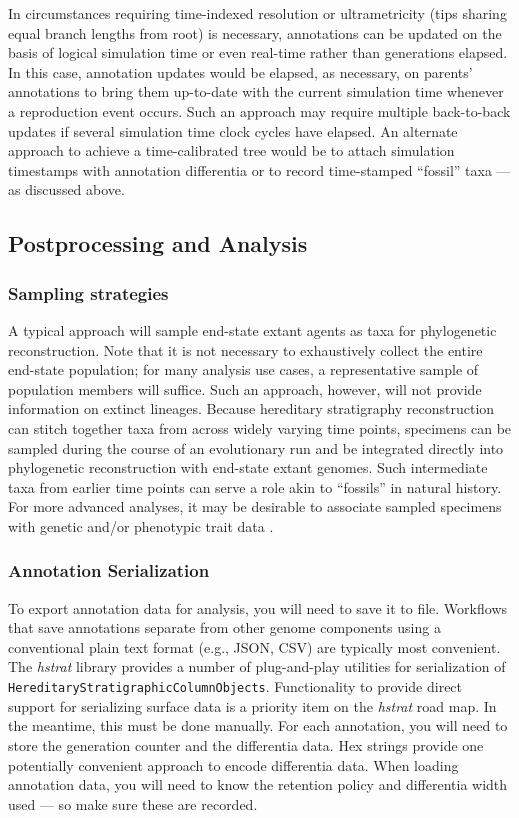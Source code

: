In circumstances requiring time-indexed resolution or ultrametricity (tips sharing equal branch lengths from root) is necessary, annotations can be updated on the basis of logical simulation time or even real-time rather than generations elapsed.
In this case, annotation updates would be elapsed, as necessary, on parents' annotations to bring them up-to-date with the current simulation time whenever a reproduction event occurs.
Such an approach may require multiple back-to-back updates if several simulation time clock cycles have elapsed.
An alternate approach to achieve a time-calibrated tree would be to attach simulation timestamps with annotation differentia or to record time-stamped ``fossil'' taxa --- as discussed above.

\subsection{Postprocessing and Analysis}

\subsubsection{Sampling strategies}

A typical approach will sample end-state extant agents as taxa for phylogenetic reconstruction.
Note that it is not necessary to exhaustively collect the entire end-state population; for many analysis use cases, a representative sample of population members will suffice.
Such an approach, however, will not provide information on extinct lineages.
Because hereditary stratigraphy reconstruction can stitch together taxa from across widely varying time points, specimens can be sampled during the course of an evolutionary run and be integrated directly into phylogenetic reconstruction with end-state extant genomes.
Such intermediate taxa from earlier time points can serve a role akin to ``fossils'' in natural history.
For more advanced analyses, it may be desirable to associate sampled specimens with genetic and/or phenotypic trait data \citep{dolson2019modes,khabbazian2016fast}.

\subsubsection{Annotation Serialization}

To export annotation data for analysis, you will need to save it to file.
Workflows that save annotations separate from other genome components using a conventional plain text format (e.g., JSON, CSV) are typically most convenient.
The \textit{hstrat} library provides a number of plug-and-play utilities for serialization of \texttt{HereditaryStratigraphicColumnObjects}.
Functionality to provide direct support for serializing surface data is a priority item on the \textit{hstrat} road map.
In the meantime, this must be done manually.
For each annotation, you will need to store the generation counter and the differentia data.
Hex strings provide one potentially convenient approach to encode differentia data.
When loading annotation data, you will need to know the retention policy and differentia width used --- so make sure these are recorded.

